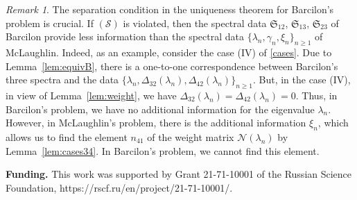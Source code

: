 \documentclass[a4paper,12pt]{article}
\newcommand{\ga}{\gamma}
\newcommand{\la}{\lambda}
\theoremstyle{plain}
\numberwithin{equation}{section}
\theoremstyle{definition}
\theoremstyle{remark}
\newtheorem{remark}[thm]{Remark}
\begin{document}
\begin{remark}
The separation condition in the uniqueness theorem for Barcilon's problem is crucial. If $(\mathcal S)$ is violated, then the spectral data $\mathfrak S_{12}$, $\mathfrak S_{13}$, $\mathfrak S_{23}$ of Barcilon provide less information than the spectral data $\{ \la_n, \ga_n, \xi_n \}_{n \ge 1}$ of McLaughlin. Indeed, as an example, consider the case (IV) of \eqref{cases}. Due to Lemma~\ref{lem:equivB}, there is a one-to-one correspondence between Barcilon's three spectra and the data $\{ \la_n, \Delta_{32}(\la_n), \Delta_{42}(\la_n) \}_{n \ge 1}$. But, in the case (IV), in view of Lemma~\ref{lem:weight}, we have $\Delta_{32}(\la_n) = \Delta_{42}(\la_n) = 0$. Thus, in Barcilon's problem, we have no additional information for the eigenvalue $\la_n$. However, in McLaughlin's problem, there is the additional information $\xi_n$, which allows us to find the element $n_{41}$ of the weight matrix $\mathcal N(\la_n)$ by Lemma~\ref{lem:cases34}. In Barcilon's problem, we cannot find this element.
\end{remark}

\medskip

{\bf Funding.} This work was supported by Grant 21-71-10001 of the Russian Science Foundation, https://rscf.ru/en/project/21-71-10001/.

\medskip
\end{document}

